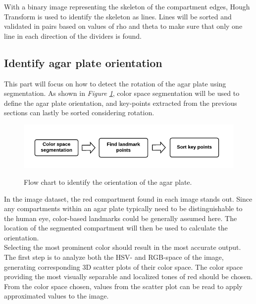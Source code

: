 \noindent With a binary image representing the skeleton of the compartment edges, Hough Transform is used to identify the skeleton as lines. Lines will be sorted and validated in pairs based on values of rho and theta to make sure that only one line in each direction of the dividers is found. \\

\subsection{Identify agar plate orientation}
This part will focus on how to detect the rotation of the agar plate using segmentation. As shown in \textit{Figure \ref{fig:orientation flowchart}}, color space segmentation will be used to define the agar plate orientation, and key-points extracted from the previous sections can lastly be sorted considering rotation.\\ 
 
 \begin{figure}[htbp]
     \centering
      \includegraphics[width=0.7\linewidth]{figures/PDF/Identify agar plate orientation.pdf}\\
     \caption{Flow chart to identify the orientation of the agar plate.}
     \label{fig:orientation flowchart}
 \end{figure}


\noindent In the image dataset, the red compartment found in each image stands out. Since any compartments within an agar plate typically need to be distinguishable to the human eye,  color-based landmarks could be generally assumed here. The location of the segmented compartment will then be used to calculate the orientation.\\

\noindent Selecting the most prominent color should result in the most accurate output. The first step is to analyze both the HSV- and RGB-space of the image, generating corresponding 3D scatter plots of their color space. The color space providing the most visually separable and localized tones of red should be chosen. From the color space chosen, values from the scatter plot can be read to apply approximated values to the image.\\

